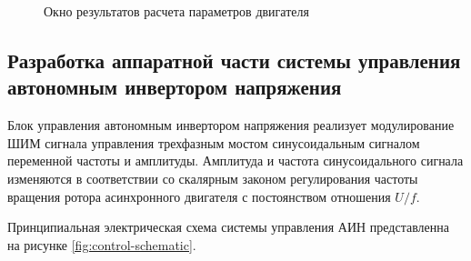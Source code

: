         \begin{figure}[h!]
            \caption{Окно результатов расчета параметров двигателя}
            \label{fig:static-scr1}
        \end{figure}




    \subsection{Разработка аппаратной части системы управления автономным
        инвертором напряжения}


        Блок управления автономным инвертором напряжения реализует
        модулирование ШИМ сигнала управления трехфазным мостом синусоидальным
        сигналом переменной частоты и амплитуды. Амплитуда и частота
        синусоидального сигнала изменяются в соответствии со скалярным законом
        регулирования частоты вращения ротора асинхронного двигателя с
        постоянством отношения $U/f$.

        Принципиальная электрическая схема системы управления АИН представленна
        на рисунке \ref{fig:control-schematic}.

